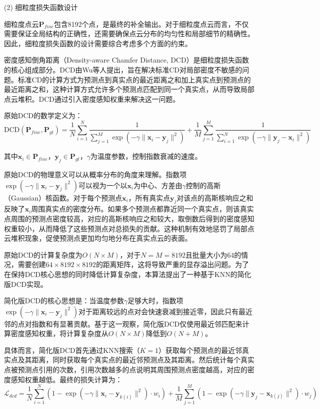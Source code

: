 (2) 细粒度损失函数设计

细粒度点云$\mathbf{P}_{fine}$包含8192个点，是最终的补全输出。对于细粒度点云而言，不仅需要保证全局结构的正确性，还需要确保点云分布的均匀性和局部细节的精确性。因此，细粒度损失函数的设计需要综合考虑多个方面的约束。

密度感知倒角距离（Density-aware Chamfer Distance, DCD）是细粒度损失函数的核心组成部分。DCD由Wu等人\cite{wu2021densityaware}提出，旨在解决标准CD对局部密度不敏感的问题。标准CD的计算方式为预测点到真实点的最近距离之和加上真实点到预测点的最近距离之和，这种计算方式允许多个预测点匹配到同一个真实点，从而导致局部点云堆积。DCD通过引入密度感知权重来解决这一问题。

原始DCD的数学定义为：
\begin{equation}
\text{DCD}(\mathbf{P}_{fine}, \mathbf{P}_{gt}) = \frac{1}{N}\sum_{i=1}^{N}\frac{1}{\sum_{j=1}^{M}\exp(-\gamma\|\mathbf{x}_i-\mathbf{y}_j\|^2)} + \frac{1}{M}\sum_{j=1}^{M}\frac{1}{\sum_{i=1}^{N}\exp(-\gamma\|\mathbf{y}_j-\mathbf{x}_i\|^2)}
\end{equation}

其中$\mathbf{x}_i \in \mathbf{P}_{fine}$，$\mathbf{y}_j \in \mathbf{P}_{gt}$，$\gamma$为温度参数，控制指数衰减的速度。

原始DCD的物理意义可以从概率分布的角度来理解。指数项$\exp(-\gamma\|\mathbf{x}_i-\mathbf{y}_j\|^2)$可以视为一个以$\mathbf{x}_i$为中心、方差由$\gamma$控制的高斯（Gaussian）核函数。对于每个预测点$\mathbf{x}_i$，所有真实点$\mathbf{y}_j$对该点的高斯核响应之和反映了$\mathbf{x}_i$周围真实点的密度分布。如果多个预测点都靠近同一个真实点，则该真实点周围的预测点密度较高，对应的高斯核响应之和较大，取倒数后得到的密度感知权重较小，从而降低了这些预测点对总损失的贡献。这种机制有效地惩罚了局部点云堆积现象，促使预测点更加均匀地分布在真实点云的表面。

原始DCD的计算复杂度为$O(N \times M)$，对于$N=M=8192$且批量大小为64的情况，需要创建$64 \times 8192 \times 8192$的距离矩阵，这将导致严重的显存溢出问题。为了在保持DCD核心思想的同时降低计算复杂度，本算法提出了一种基于KNN的简化版DCD实现。

简化版DCD的核心思想是：当温度参数$\gamma$足够大时，指数项$\exp(-\gamma\|\mathbf{x}_i-\mathbf{y}_j\|^2)$对于距离较远的点对会快速衰减到接近零，因此只有最近邻的点对指数和有显著贡献。基于这一观察，简化版DCD仅使用最近邻匹配来计算密度感知权重，将计算复杂度从$O(N \times M)$降低到$O(N+M)$。

具体而言，简化版DCD首先通过KNN搜索（$K=1$）获取每个预测点的最近邻真实点及其距离，同时获取每个真实点的最近邻预测点及其距离。然后统计每个真实点被预测点引用的次数，引用次数越多的点说明其周围预测点密度越高，对应的密度感知权重越低。最终的损失计算为：
\begin{equation}
\mathcal{L}_{dcd} = \frac{1}{N}\sum_{i=1}^{N}\left(1 - \exp(-\gamma\|\mathbf{x}_i-\mathbf{y}_{k(i)}\|^2) \cdot w_i\right) + \frac{1}{M}\sum_{j=1}^{M}\left(1 - \exp(-\gamma\|\mathbf{y}_j-\mathbf{x}_{k(j)}\|^2) \cdot w_j\right)
\end{equation}

